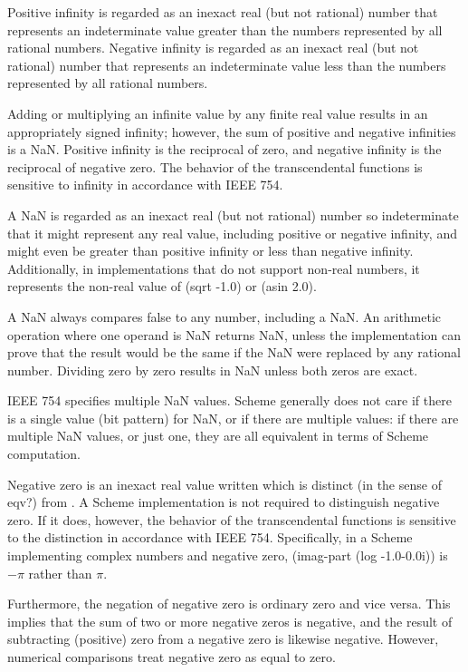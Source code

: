 Positive infinity is regarded as an inexact real (but not rational)
number that represents an indeterminate value greater than the
numbers represented by all rational numbers. Negative infinity
is regarded as an inexact real (but not rational) number that
represents an indeterminate value less than the numbers represented
by all rational numbers.

Adding or multiplying an infinite value by any finite real value results
in an appropriately signed infinity; however, the sum of positive and
negative infinities is a NaN.  Positive infinity is the reciprocal
of zero, and negative infinity is the reciprocal of negative zero.
The behavior of the transcendental functions is sensitive to infinity
in accordance with IEEE 754.

A NaN is regarded as an inexact real (but not rational) number
so indeterminate that it might represent any real value, including
positive or negative infinity, and might even be greater than positive
infinity or less than negative infinity.
Additionally, in implementations that do not support non-real numbers, it
represents the non-real value of {\cf (sqrt -1.0)} or {\cf (asin 2.0)}.

A NaN always compares false to any number, including a NaN.  
An arithmetic operation where one operand is NaN returns NaN, unless the
implementation can prove that the result would be the same if the NaN
were replaced by any rational number.  Dividing zero by zero results in
NaN unless both zeros are exact.

IEEE 754 specifies multiple NaN values.  Scheme generally does
not care if there is a single value (bit pattern) for NaN,
or if there are multiple values: if there are multiple NaN
values, or just one, they are all equivalent in terms of Scheme
computation.

Negative zero is an inexact real value written {} which is distinct
(in the sense of {\cf eqv?}) from {}.  A Scheme implementation
is not required to distinguish negative zero.  If it does, however, the
behavior of the transcendental functions is sensitive to the distinction
in accordance with IEEE 754.
Specifically, in a Scheme implementing complex numbers and negative zero,
{\cf (imag-part (log -1.0-0.0i))} is $-\pi$ rather than $\pi$.

Furthermore, the negation of negative zero is ordinary zero and vice
versa.  This implies that the sum of two or more negative zeros is negative,
and the result of subtracting (positive) zero from a negative zero is
likewise negative.  However, numerical comparisons treat negative zero
as equal to zero.

